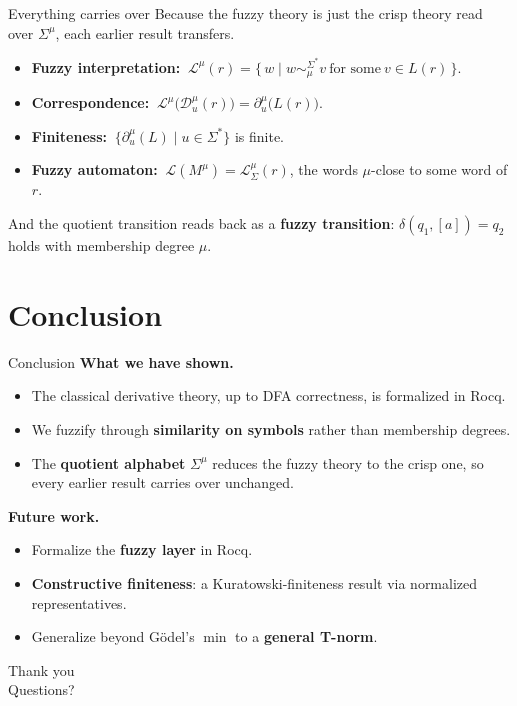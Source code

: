 \documentclass[aspectratio=169]{beamer}
\newcommand{\cut}{\mu}
\newcommand{\Dd}{\mathcal{D}}                 %
\begin{document}
\begin{frame}{Everything carries over}
  Because the fuzzy theory is just the crisp theory read over $\Sigma^\cut$,
  each earlier result transfers.
  \begin{itemize}
    \item \textbf{Fuzzy interpretation:}
      $\ \mathcal L^\cut(r)=\{\,w\mid w\sim_\cut^{\Sigma^*}v\ \text{for some}\ v\in L(r)\,\}$.
    \item \textbf{Correspondence:}
      $\ \mathcal L^\cut\big(\Dd_u^\cut(r)\big)=\partial_u^\cut\big(L(r)\big)$.
    \item \textbf{Finiteness:} $\ \{\partial_u^\cut(L)\mid u\in\Sigma^*\}$ is finite.
    \item \textbf{Fuzzy automaton:} $\ \mathcal L(M^\cut)=\mathcal L_\Sigma^\cut(r)$,
      the words $\cut$-close to some word of $r$.
  \end{itemize}
  \vfill
  And the quotient transition reads back as a \textbf{fuzzy
  transition}: $\delta(q_1,[a])=q_2$ holds with membership degree $\cut$.
\end{frame}

\section{Conclusion}

\begin{frame}{Conclusion}
  \textbf{What we have shown.}
  \begin{itemize}
    \item The classical derivative theory, up to DFA correctness, is
          formalized in Rocq.
    \item We fuzzify through \textbf{similarity on symbols} rather than
          membership degrees.
    \item The \textbf{quotient alphabet} $\Sigma^\cut$ reduces the fuzzy theory
          to the crisp one, so every earlier result carries over unchanged.
  \end{itemize}
  \medskip
  \textbf{Future work.}
  \begin{itemize}
    \item Formalize the \textbf{fuzzy layer} in Rocq.
    \item \textbf{Constructive finiteness}: a Kuratowski-finiteness result via
          normalized representatives.
    \item Generalize beyond G\"odel's $\min$ to a \textbf{general T-norm}.
  \end{itemize}
\end{frame}

\begin{frame}
  \vfill
  \begin{center}
    {\Huge Thank you}\\[0.6em]
    {\large Questions?}
  \end{center}
  \vfill
\end{frame}
\end{document}
